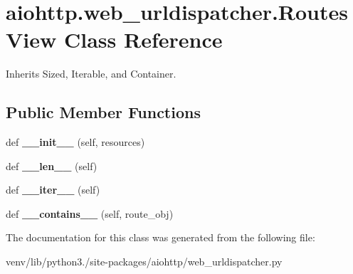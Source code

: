 \hypertarget{classaiohttp_1_1web__urldispatcher_1_1_routes_view}{}\section{aiohttp.\+web\+\_\+urldispatcher.\+Routes\+View Class Reference}
\label{classaiohttp_1_1web__urldispatcher_1_1_routes_view}


Inherits Sized, Iterable, and Container.

\subsection*{Public Member Functions}
\begin{DoxyCompactItemize}
\item 
\mbox{\label{classaiohttp_1_1web__urldispatcher_1_1_routes_view_a588bb8b9a56e7d16dedea245bac0534e}} 
def {\bfseries \+\_\+\+\_\+init\+\_\+\+\_\+} (self, resources)
\item 
\mbox{\label{classaiohttp_1_1web__urldispatcher_1_1_routes_view_a5f573539bde395a64f701ecc7c5a4f77}} 
def {\bfseries \+\_\+\+\_\+len\+\_\+\+\_\+} (self)
\item 
\mbox{\label{classaiohttp_1_1web__urldispatcher_1_1_routes_view_a8a0497233d65b480cee484b0b1785663}} 
def {\bfseries \+\_\+\+\_\+iter\+\_\+\+\_\+} (self)
\item 
\mbox{\label{classaiohttp_1_1web__urldispatcher_1_1_routes_view_a370fe0ec9b9d2bf899b01f6be183ca0e}} 
def {\bfseries \+\_\+\+\_\+contains\+\_\+\+\_\+} (self, route\+\_\+obj)
\end{DoxyCompactItemize}


The documentation for this class was generated from the following file\+:\begin{DoxyCompactItemize}
\item 
venv/lib/python3./site-\/packages/aiohttp/web\+\_\+urldispatcher.\+py\end{DoxyCompactItemize}
